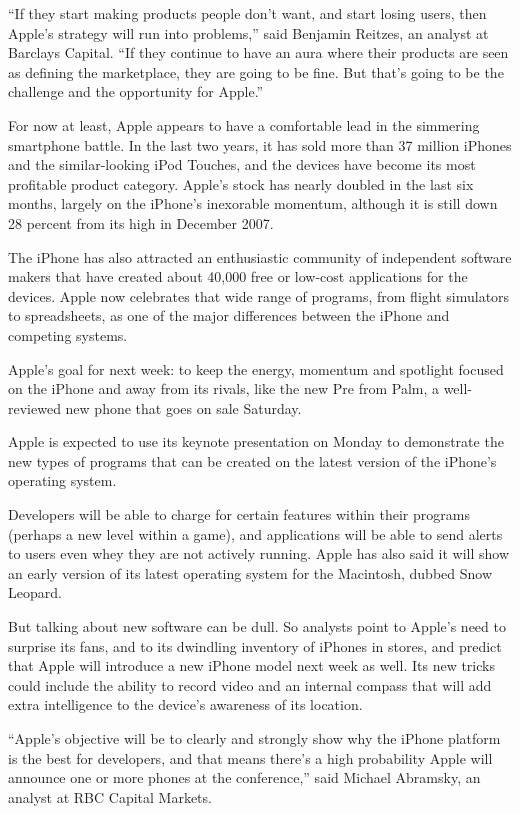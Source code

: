 \documentclass[12pt,a4paper,onecolumn]{article}
\begin{document}
``If they start making products people don't want, and start losing users, then Apple's strategy
will run into problems,'' said Benjamin Reitzes, an analyst at Barclays Capital. ``If they continue
to have an aura where their products are seen as defining the marketplace, they are going to be
fine. But that's going to be the challenge and the opportunity for Apple.''

For now at least, Apple appears to have a comfortable lead in the simmering smartphone battle. In
the last two years, it has sold more than 37 million iPhones and the similar-looking iPod Touches,
and the devices have become its most profitable product category. Apple's stock has nearly doubled
in the last six months, largely on the iPhone's inexorable momentum, although it is still down 28
percent from its high in December 2007.

The iPhone has also attracted an enthusiastic community of independent software makers that have
created about 40,000 free or low-cost applications for the devices. Apple now celebrates that wide
range of programs, from flight simulators to spreadsheets, as one of the major differences between
the iPhone and competing systems.

Apple's goal for next week: to keep the energy, momentum and spotlight focused on the iPhone and
away from its rivals, like the new Pre from Palm, a well-reviewed new phone that goes on sale
Saturday.

Apple is expected to use its keynote presentation on Monday to demonstrate the new types of programs
that can be created on the latest version of the iPhone's operating system.

Developers will be able to charge for certain features within their programs (perhaps a new level
within a game), and applications will be able to send alerts to users even whey they are not
actively running. Apple has also said it will show an early version of its latest operating system
for the Macintosh, dubbed Snow Leopard.

But talking about new software can be dull. So analysts point to Apple's need to surprise its fans,
and to its dwindling inventory of iPhones in stores, and predict that Apple will introduce a new
iPhone model next week as well. Its new tricks could include the ability to record video and an
internal compass that will add extra intelligence to the device's awareness of its location.

``Apple's objective will be to clearly and strongly show why the iPhone platform is the best for
developers, and that means there's a high probability Apple will announce one or more phones at the
conference,'' said Michael Abramsky, an analyst at RBC Capital Markets.
\end{document}

